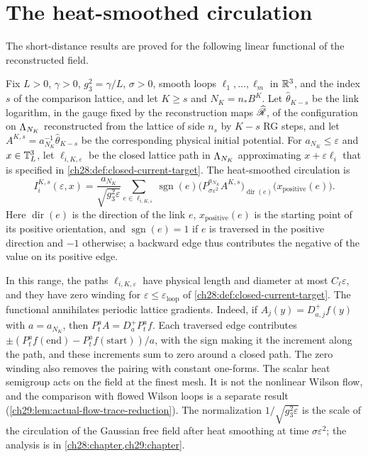 \section{The heat-smoothed circulation}\label{ch01:sec:current}

The short-distance results are proved for the following linear functional of the reconstructed field.

\begin{definition}\label{ch01:def:heat-current}
Fix $L>0$, $\gamma>0$, $g_3^2=\gamma/L$, $\sigma>0$, smooth loops $\ell_1,\dots,\ell_m$ in $\mathbb R^3$, and the index $s$ of the comparison lattice, and let $K\ge s$ and $N_K=n_*B^K$. Let $\widehat\theta_{K-s}$ be the link logarithm, in the gauge fixed by the reconstruction maps $\widehat{\mathscr R}$, of the configuration on $\Lambda_{N_K}$ reconstructed from the lattice of side $n_s$ by $K-s$ RG steps, and let $A^{K,s}=a_{N_K}^{-1}\widehat\theta_{K-s}$ be the corresponding physical initial potential. For $a_{N_K}\le\varepsilon$ and $x\in\mathbb T_L^3$, let $\ell_{i,K,\varepsilon}$ be the closed lattice path in $\Lambda_{N_K}$ approximating $x+\varepsilon\ell_i$ that is specified in \cref{ch28:def:closed-current-target}. The heat-smoothed circulation is
\[
 I_i^{K,s}(\varepsilon,x)=\frac{a_{N_K}}{\sqrt{g_3^2\varepsilon}}
 \sum_{e\in\ell_{i,K,\varepsilon}}\operatorname{sgn}(e)
       \bigl(P_{\sigma\varepsilon^2}^{a_{N_K}}A^{K,s}\bigr)_{\operatorname{dir}(e)}
                                     \bigl(x_{\mathrm{positive}}(e)\bigr).
\]
Here $\operatorname{dir}(e)$ is the direction of the link $e$, $x_{\mathrm{positive}}(e)$ is the starting point of its positive orientation, and $\operatorname{sgn}(e)=1$ if $e$ is traversed in the positive direction and $-1$ otherwise; a backward edge thus contributes the negative of the value on its positive edge.
\end{definition}

In this range, the paths $\ell_{i,K,\varepsilon}$ have physical length and diameter at most $C_\ell\varepsilon$, and they have zero winding for $\varepsilon\le\varepsilon_{\mathrm{loop}}$ of \cref{ch28:def:closed-current-target}. The functional annihilates periodic lattice gradients. Indeed, if $A_j(y)=D^+_{a,j}f(y)$ with $a=a_{N_K}$, then $P^a_tA=D^+_aP^a_tf$. Each traversed edge contributes $\pm(P^a_tf(\text{end})-P^a_tf(\text{start}))/a$, with the sign making it the increment along the path, and these increments sum to zero around a closed path. The zero winding also removes the pairing with constant one-forms. The scalar heat semigroup acts on the field at the finest mesh. It is not the nonlinear Wilson flow, and the comparison with flowed Wilson loops is a separate result (\cref{ch29:lem:actual-flow-trace-reduction}). The normalization $1/\sqrt{g_3^2\varepsilon}$ is the scale of the circulation of the Gaussian free field after heat smoothing at time $\sigma\varepsilon^2$; the analysis is in \cref{ch28:chapter,ch29:chapter}.

